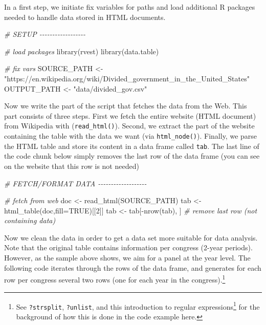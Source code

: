 \documentclass[
  12pt,
]{style/krantz}
\newenvironment{Shaded}{\begin{snugshade}}{\end{snugshade}}
\newcommand{\AttributeTok}[1]{\textcolor[rgb]{0.77,0.63,0.00}{#1}}
\newcommand{\CommentTok}[1]{\textcolor[rgb]{0.56,0.35,0.01}{\textit{#1}}}
\newcommand{\ConstantTok}[1]{\textcolor[rgb]{0.00,0.00,0.00}{#1}}
\newcommand{\DecValTok}[1]{\textcolor[rgb]{0.00,0.00,0.81}{#1}}
\newcommand{\FunctionTok}[1]{\textcolor[rgb]{0.00,0.00,0.00}{#1}}
\newcommand{\NormalTok}[1]{#1}
\newcommand{\OtherTok}[1]{\textcolor[rgb]{0.56,0.35,0.01}{#1}}
\newcommand{\SpecialCharTok}[1]{\textcolor[rgb]{0.00,0.00,0.00}{#1}}
\newcommand{\StringTok}[1]{\textcolor[rgb]{0.31,0.60,0.02}{#1}}
\renewcommand{\href}[2]{#2\footnote{\url{#1}}}
\begin{document}
In a first step, we initiate fix variables for paths and load additional R packages needed to handle data stored in HTML documents.

\begin{Shaded}
\begin{Highlighting}[]
\CommentTok{\# SETUP {-}{-}{-}{-}{-}{-}{-}{-}{-}{-}{-}{-}{-}{-}{-}{-}{-}{-}}

\CommentTok{\# load packages}
\FunctionTok{library}\NormalTok{(rvest)}
\FunctionTok{library}\NormalTok{(data.table)}

\CommentTok{\# fix vars}
\NormalTok{SOURCE\_PATH }\OtherTok{\textless{}{-}} \StringTok{"https://en.wikipedia.org/wiki/Divided\_government\_in\_the\_United\_States"}
\NormalTok{OUTPUT\_PATH }\OtherTok{\textless{}{-}} \StringTok{"data/divided\_gov.csv"}
\end{Highlighting}
\end{Shaded}

Now we write the part of the script that fetches the data from the Web. This part consists of three steps. First we fetch the entire website (HTML document) from Wikipedia with (\texttt{read\_html()}). Second, we extract the part of the website containing the table with the data we want (via \texttt{html\_node()}). Finally, we parse the HTML table and store its content in a data frame called \texttt{tab}. The last line of the code chunk below simply removes the last row of the data frame (you can see on the website that this row is not needed)

\begin{Shaded}
\begin{Highlighting}[]
\CommentTok{\# FETCH/FORMAT DATA {-}{-}{-}{-}{-}{-}{-}{-}{-}{-}{-}{-}{-}{-}{-}{-}{-}{-}{-}}

\CommentTok{\# fetch from web}
\NormalTok{doc }\OtherTok{\textless{}{-}} \FunctionTok{read\_html}\NormalTok{(SOURCE\_PATH)}
\NormalTok{tab }\OtherTok{\textless{}{-}} \FunctionTok{html\_table}\NormalTok{(doc,}\AttributeTok{fill=}\ConstantTok{TRUE}\NormalTok{)[[}\DecValTok{2}\NormalTok{]]}
\NormalTok{tab }\OtherTok{\textless{}{-}}\NormalTok{ tab[}\SpecialCharTok{{-}}\FunctionTok{nrow}\NormalTok{(tab), ] }\CommentTok{\# remove last row (not containing data)}
\end{Highlighting}
\end{Shaded}

Now we clean the data in order to get a data set more suitable for data analysis. Note that the original table contains information per congress (2-year periods). However, as the sample above shows, we aim for a panel at the year level. The following code iterates through the rows of the data frame, and generates for each row per congress several two rows (one for each year in the congress).\footnote{See \texttt{?strsplit}, \texttt{?unlist}, and \href{https://www.oreilly.com/content/an-introduction-to-regular-expressions/}{this introduction to regular expressions} for the background of how this is done in the code example here.}
\end{document}
